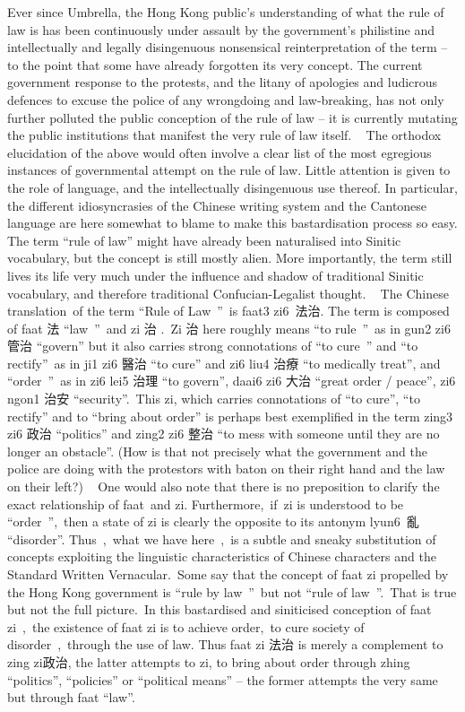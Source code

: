 Ever since Umbrella, the Hong Kong public’s understanding of what the rule of law is has been continuously under assault by the government’s philistine and intellectually and legally disingenuous nonsensical reinterpretation of the term – to the point that some have already forgotten its very concept. The current government response to the protests, and the litany of apologies and ludicrous defences to excuse the police of any wrongdoing and law-breaking, has not only further polluted the public conception of the rule of law – it is currently mutating the public institutions that manifest the very rule of law itself.
 
The orthodox elucidation of the above would often involve a clear list of the most egregious instances of governmental attempt on the rule of law. Little attention is given to the role of language, and the intellectually disingenuous use thereof. In particular, the different idiosyncrasies of the Chinese writing system and the Cantonese language are here somewhat to blame to make this bastardisation process so easy. The term “rule of law” might have already been naturalised into Sinitic vocabulary, but the concept is still mostly alien. More importantly, the term still lives its life very much under the influence and shadow of traditional Sinitic vocabulary, and therefore traditional Confucian-Legalist thought.
 
The Chinese translation of the term “Rule of Law ” is faat3 zi6 法治. The term is composed of faat 法 “law ” and zi 治 . Zi 治 here roughly means “to rule ” as in gun2 zi6 管治 “govern” but it also carries strong connotations of “to cure ” and “to rectify” as in ji1 zi6 醫治 “to cure” and zi6 liu4 治療 “to medically treat”, and “order ” as in zi6 lei5 治理 “to govern”, daai6 zi6 大治 “great order / peace”, zi6 ngon1 治安 “security”. This zi, which carries connotations of “to cure”, “to rectify” and to “bring about order” is perhaps best exemplified in the term zing3 zi6 政治 “politics” and zing2 zi6 整治 “to mess with someone until they are no longer an obstacle”. (How is that not precisely what the government and the police are doing with the protestors with baton on their right hand and the law on their left?)
 
One would also note that there is no preposition to clarify the exact relationship of faat and zi. Furthermore, if zi is understood to be “order ”, then a state of zi is clearly the opposite to its antonym lyun6 亂 “disorder”. Thus , what we have here , is a subtle and sneaky substitution of concepts exploiting the linguistic characteristics of Chinese characters and the Standard Written Vernacular. Some say that the concept of faat zi propelled by the Hong Kong government is “rule by law ” but not “rule of law ”. That is true but not the full picture. In this bastardised and siniticised conception of faat zi , the existence of faat zi is to achieve order, to cure society of disorder , through the use of law. Thus faat zi 法治 is merely a complement to zing zi政治, the latter attempts to zi, to bring about order through zhing “politics”, “policies” or “political means” – the former attempts the very same but through faat “law”.
